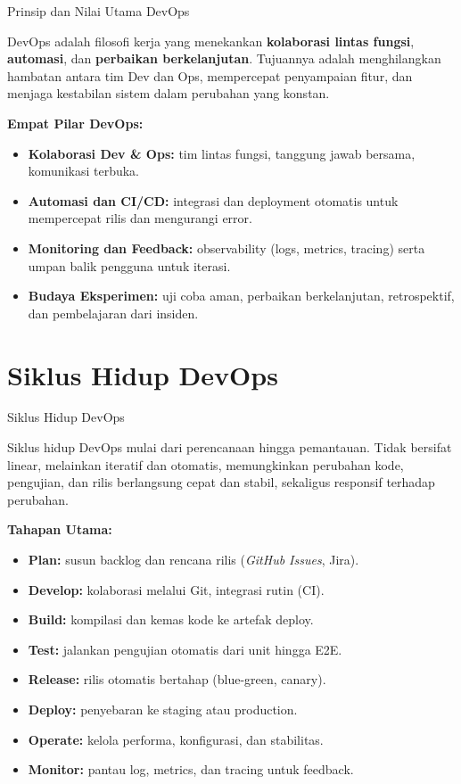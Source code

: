 \documentclass[aspectratio=169, table]{beamer}
\begin{document}
\begin{frame}[fragile]{Prinsip dan Nilai Utama DevOps}
	\vspace{20pt}
	
	DevOps adalah filosofi kerja yang menekankan \textbf{kolaborasi lintas fungsi}, \textbf{automasi}, dan \textbf{perbaikan berkelanjutan}. Tujuannya adalah menghilangkan hambatan antara tim Dev dan Ops, mempercepat penyampaian fitur, dan menjaga kestabilan sistem dalam perubahan yang konstan.
	
	\vspace{6pt}
	\textbf{Empat Pilar DevOps:}
	\begin{itemize}
		\item \textbf{Kolaborasi Dev \& Ops:} tim lintas fungsi, tanggung jawab bersama, komunikasi terbuka.
		\item \textbf{Automasi dan CI/CD:} integrasi dan deployment otomatis untuk mempercepat rilis dan mengurangi error.
		\item \textbf{Monitoring dan Feedback:} observability (logs, metrics, tracing) serta umpan balik pengguna untuk iterasi.
		\item \textbf{Budaya Eksperimen:} uji coba aman, perbaikan berkelanjutan, retrospektif, dan pembelajaran dari insiden.
	\end{itemize}
\end{frame}



\section{Siklus Hidup DevOps}

\begin{frame}[fragile]{Siklus Hidup DevOps}
	\vspace{20pt}
	
	Siklus hidup DevOps mulai dari perencanaan hingga pemantauan. Tidak bersifat linear, melainkan iteratif dan otomatis, memungkinkan perubahan kode, pengujian, dan rilis berlangsung cepat dan stabil, sekaligus responsif terhadap perubahan.
	
	\vspace{6pt}
	\textbf{Tahapan Utama:}
	\begin{itemize}
		\item \textbf{Plan:} susun backlog dan rencana rilis (\textit{GitHub Issues}, Jira).
		\item \textbf{Develop:} kolaborasi melalui Git, integrasi rutin (CI).
		\item \textbf{Build:} kompilasi dan kemas kode ke artefak deploy.
		\item \textbf{Test:} jalankan pengujian otomatis dari unit hingga E2E.
		\item \textbf{Release:} rilis otomatis bertahap (blue-green, canary).
		\item \textbf{Deploy:} penyebaran ke staging atau production.
		\item \textbf{Operate:} kelola performa, konfigurasi, dan stabilitas.
		\item \textbf{Monitor:} pantau log, metrics, dan tracing untuk feedback.
	\end{itemize}
\end{frame}
\end{document}
